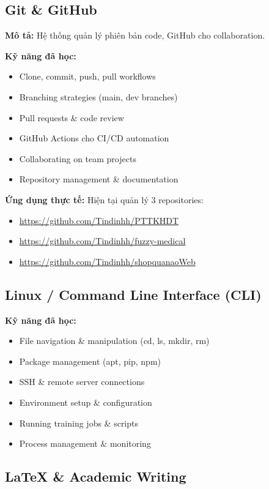 \documentclass[12pt,a4paper]{article}
\begin{document}
\subsection{Git \& GitHub}

\textbf{Mô tả:} Hệ thống quản lý phiên bản code, GitHub cho collaboration.

\textbf{Kỹ năng đã học:}
\begin{itemize}
    \item Clone, commit, push, pull workflows
    \item Branching strategies (main, dev branches)
    \item Pull requests \& code review
    \item GitHub Actions cho CI/CD automation
    \item Collaborating on team projects
    \item Repository management \& documentation
\end{itemize}

\textbf{Ứng dụng thực tế:}
Hiện tại quản lý 3 repositories:
\begin{itemize}
    \item \url{https://github.com/Tindinhh/PTTKHDT}
    \item \url{https://github.com/Tindinhh/fuzzy-medical}
    \item \url{https://github.com/Tindinhh/shopquanaoWeb}
\end{itemize}

\subsection{Linux / Command Line Interface (CLI)}

\textbf{Kỹ năng đã học:}
\begin{itemize}
    \item File navigation \& manipulation (cd, ls, mkdir, rm)
    \item Package management (apt, pip, npm)
    \item SSH \& remote server connections
    \item Environment setup \& configuration
    \item Running training jobs \& scripts
    \item Process management \& monitoring
\end{itemize}

\subsection{LaTeX \& Academic Writing}
\end{document}
